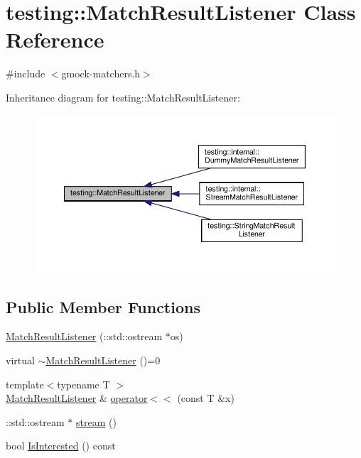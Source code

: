 \hypertarget{classtesting_1_1_match_result_listener}{}\section{testing\+:\+:Match\+Result\+Listener Class Reference}
\label{classtesting_1_1_match_result_listener}


{\ttfamily \#include $<$gmock-\/matchers.\+h$>$}



Inheritance diagram for testing\+:\+:Match\+Result\+Listener\+:
\nopagebreak
\begin{figure}[H]
\begin{center}
\leavevmode
\includegraphics[width=350pt]{classtesting_1_1_match_result_listener__inherit__graph}
\end{center}
\end{figure}
\subsection*{Public Member Functions}
\begin{DoxyCompactItemize}
\item 
\hyperlink{classtesting_1_1_match_result_listener_a245c360286cd0496d22a4d2fde80eb0b}{Match\+Result\+Listener} (\+::std\+::ostream $\ast$os)
\item 
virtual \hyperlink{classtesting_1_1_match_result_listener_aa29f43f7b2ffd850c721a8a33ccbba92}{$\sim$\+Match\+Result\+Listener} ()=0
\item 
{\footnotesize template$<$typename T $>$ }\\\hyperlink{classtesting_1_1_match_result_listener}{Match\+Result\+Listener} \& \hyperlink{classtesting_1_1_match_result_listener_a89f628a452635d1502a9062d9c864ebd}{operator$<$$<$} (const T \&x)
\item 
\+::std\+::ostream $\ast$ \hyperlink{classtesting_1_1_match_result_listener_a5abecb247e005f7f50a94898e3f44ee3}{stream} ()
\item 
bool \hyperlink{classtesting_1_1_match_result_listener_ac34f9771f2ba6128cd6a1348b3aebda3}{Is\+Interested} () const
\end{DoxyCompactItemize}



